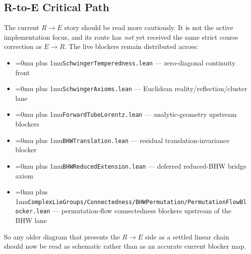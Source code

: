 \documentclass[11pt,a4paper]{article}
\newcommand{\leanfile}[1]{\begingroup\Urlmuskip=0mu plus 1mu\relax\nolinkurl{#1}\endgroup}
\begin{document}
\subsection{R-to-E Critical Path}

The current $R \to E$ story should be read more cautiously. It is not the active
implementation focus, and its route has \emph{not} yet received the same strict
course correction as $E \to R$. The live blockers remain distributed across:
\begin{itemize}
\item \leanfile{SchwingerTemperedness.lean} --- zero-diagonal continuity front
\item \leanfile{SchwingerAxioms.lean} --- Euclidean reality/reflection/cluster lane
\item \leanfile{ForwardTubeLorentz.lean} --- analytic-geometry upstream blockers
\item \leanfile{BHWTranslation.lean} --- residual translation-invariance blocker
\item \leanfile{BHWReducedExtension.lean} --- deferred reduced-BHW bridge axiom
\item \leanfile{ComplexLieGroups/Connectedness/BHWPermutation/PermutationFlowBlocker.lean}
  --- permutation-flow connectedness blockers upstream of the BHW lane
\end{itemize}

So any older diagram that presents the $R \to E$ side as a settled linear chain
should now be read as schematic rather than as an accurate current blocker map.
\end{document}
